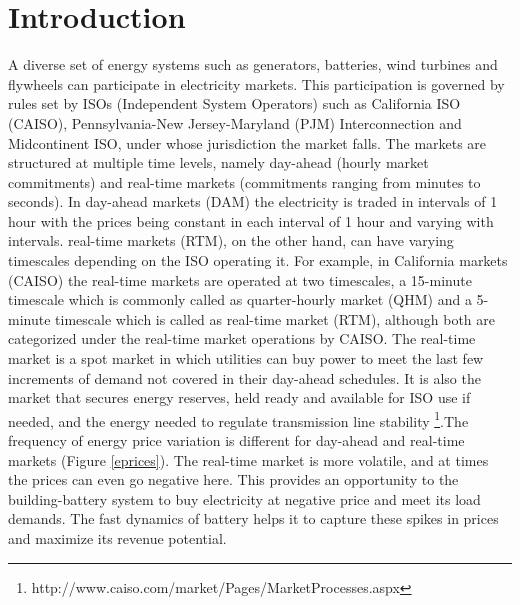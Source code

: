 \documentclass[11pt,twoside]{article}
\begin{document}
\section{Introduction}
A diverse set of energy systems such as generators, batteries, wind turbines and flywheels can participate in electricity markets. This participation is governed by rules set by ISOs (Independent System Operators) such as California ISO (CAISO), Pennsylvania-New Jersey-Maryland (PJM) Interconnection and Midcontinent ISO, under whose jurisdiction the market falls. The markets are structured at multiple time levels, namely day-ahead (hourly market commitments) and real-time markets (commitments ranging from minutes to seconds). In day-ahead markets (DAM) the electricity is traded in intervals of 1 hour with the prices being constant in each interval of 1 hour and varying with intervals. real-time markets (RTM), on the other hand, can have varying timescales depending on the ISO operating it. For example, in California markets (CAISO) the real-time markets are operated at two timescales, a 15-minute timescale which is commonly called as quarter-hourly market (QHM) and a 5-minute timescale which is called as real-time market (RTM), although both are categorized under the real-time market operations by CAISO. The real-time market is a spot market in which utilities can buy power to meet the last few increments of demand not covered in their day-ahead schedules. It is also the market that secures energy reserves, held ready and available for ISO use if needed, and the energy needed to regulate transmission line stability \footnote{http://www.caiso.com/market/Pages/MarketProcesses.aspx}.The frequency of energy price variation is different for day-ahead and real-time markets (Figure \ref{eprices}). The real-time market is more volatile, and at times the prices can even go negative here. This provides an opportunity to the building-battery system to buy electricity at negative price and meet its load demands. The fast dynamics of battery helps it to capture these spikes in prices and maximize its revenue potential. 
\end{document}
